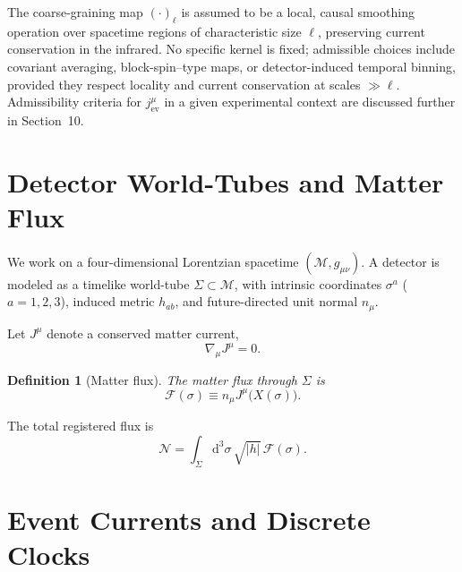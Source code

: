 \documentclass[pdflatex,sn-mathphys-num]{sn-jnl}
\theoremstyle{thmstylethree}
\newtheorem{definition}{Definition}[section]
\theoremstyle{thmstyleone}
\theoremstyle{thmstyletwo}
\numberwithin{equation}{section}
\newcommand{\dd}{\mathrm{d}}
\newcommand{\Sig}{\Sigma}
\newcommand{\F}{\mathcal{F}}
\begin{document}
            The coarse-graining map $(\cdot)_\ell$ is assumed to be a local, causal smoothing operation over spacetime regions of characteristic size $\ell$, preserving current conservation in the infrared. No specific kernel is fixed; admissible choices include covariant averaging, block-spin--type maps, or detector-induced temporal binning, provided they respect locality and current conservation at scales $\gg\ell$.
            Admissibility criteria for $j^\mu_{\mathrm{ev}}$ in a given experimental context are discussed further in Section~10.

    \section{Detector World-Tubes and Matter Flux}
    
    We work on a four-dimensional Lorentzian spacetime $(\mathcal{M},g_{\mu\nu})$. A detector is modeled as a timelike world-tube $\Sig \subset \mathcal{M}$, with intrinsic coordinates $\sigma^a$ ($a=1,2,3$), induced metric $h_{ab}$, and future-directed unit normal $n_\mu$.
    
    Let $J^\mu$ denote a conserved matter current,
    \begin{equation}
        \nabla_\mu J^\mu = 0 .
    \end{equation}
    
    \begin{definition}[Matter flux]
The matter flux through $\Sig$ is
\begin{equation}
    \F(\sigma) \equiv n_\mu J^\mu\big(X(\sigma)\big).
\end{equation}
    \end{definition}
    
    The total registered flux is
    \begin{equation}
        \mathcal{N} = \int_\Sig \dd^3\sigma\,\sqrt{|h|}\,\F(\sigma).
    \end{equation}

    \section{Event Currents and Discrete Clocks}
    
\end{document}
